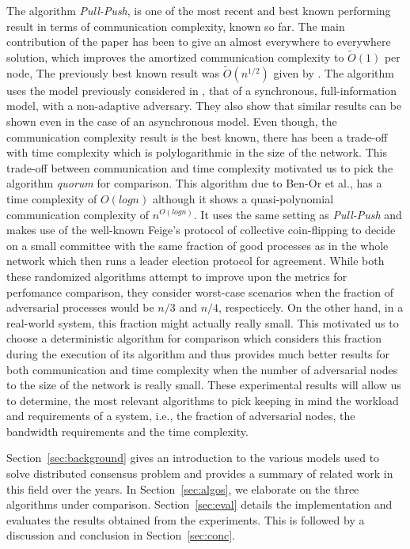 The algorithm \textit{Pull-Push}, is one of the most recent and best known performing result in terms of communication complexity, known so far. The main contribution of the paper has been to give an almost everywhere to everywhere solution, which improves the amortized communication complexity to $\tilde{O}(1)$ per node, The previously best known result was $\tilde{O}(n^{1/2})$ given by \cite{KLST11}. The algorithm uses the model previously considered in \cite{KLST11,KSSV06,BPV06,KS09}, that of a synchronous, full-information model, with a non-adaptive adversary. They also show that similar results can be shown even in the case of an asynchronous model. Even though, the communication complexity result is the best known, there has been a trade-off with time complexity which is polylogarithmic in the size of the network. This trade-off between communication and time complexity motivated us to pick the algorithm \textit{quorum} for comparison. This algorithm due to Ben-Or et al., has a time complexity of $O(logn)$ although it shows a quasi-polynomial communication complexity of $n^{O(logn)}$. It uses the same setting as \textit{Pull-Push} and makes use of the well-known Feige's protocol of collective coin-flipping to decide on a small committee with the same fraction of good processes as in the whole network which then runs a leader election protocol for agreement. While both these randomized algorithms attempt to improve upon the metrics for perfomance comparison, they consider worst-case scenarios when the fraction of adversarial processes would be $n/3$ and $n/4$, respecticely. On the other hand, in a real-world system, this fraction might actually really small. This motivated us to choose a deterministic algorithm for comparison which considers this fraction during the execution of its algorithm and thus provides much better results for both communication and time complexity when the number of adversarial nodes to the size of the network is really small. These experimental results will allow us to determine, the most relevant algorithms to pick keeping in mind the workload and requirements of a system, i.e., the fraction of adversarial nodes, the bandwidth requirements and the time complexity. 


Section~\ref{sec:background} gives an introduction to the various models used to solve distributed consensus problem and provides a summary of related work in this field over the years. In Section~\ref{sec:algos}, we elaborate on the three algorithms under comparison. Section~\ref{sec:eval} details the implementation and evaluates the results obtained from the experiments. This is followed by a discussion and conclusion in Section~\ref{sec:conc}.

